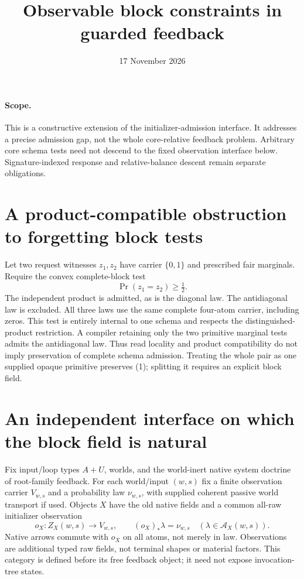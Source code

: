 \documentclass[11pt]{article}
\title{Observable block constraints in guarded feedback}
\date{17 November 2026}
\begin{document}
\maketitle
\paragraph{Scope.} This is a constructive extension of the initializer-admission interface. It addresses a precise admission gap, not the whole core-relative feedback problem. Arbitrary core schema tests need not descend to the fixed observation interface below. Signature-indexed response and relative-balance descent remain separate obligations.

\section{A product-compatible obstruction to forgetting block tests}
Let two request witnesses $z_1,z_2$ have carrier $\{0,1\}$ and prescribed fair marginals. Require the convex complete-block test
\[
                    \Pr(z_1=z_2)\geq\tfrac12.                 \tag{1}
\]
The independent product is admitted, as is the diagonal law. The antidiagonal law is excluded. All three laws use the same complete four-atom carrier, including zeros. This test is entirely internal to one schema and respects the distinguished-product restriction. A compiler retaining only the two primitive marginal tests admits the antidiagonal law. Thus read locality and product compatibility do not imply preservation of complete schema admission. Treating the whole pair as one supplied opaque primitive preserves (1); splitting it requires an explicit block field.

\section{An independent interface on which the block field is natural}
Fix input/loop types $A+U$, worlds, and the world-inert native system doctrine of root-family feedback. For each world/input $(w,s)$ fix a finite observation carrier $V_{w,s}$ and a probability law $\nu_{w,s}$, with supplied coherent passive world transport if used. Objects $X$ have the old native fields and a common all-raw initializer observation
\[
 o_X:Z_X(w,s)\longrightarrow V_{w,s},\qquad
 (o_X)_*\lambda=\nu_{w,s}\quad(\lambda\in\mathcal A_X(w,s)).   \tag{2}
\]
Native arrows commute with $o_X$ on all atoms, not merely in law. Observations are additional typed raw fields, not terminal shapes or material factors. This category is defined before its free feedback object; it need not expose invocation-tree states.
\end{document}
